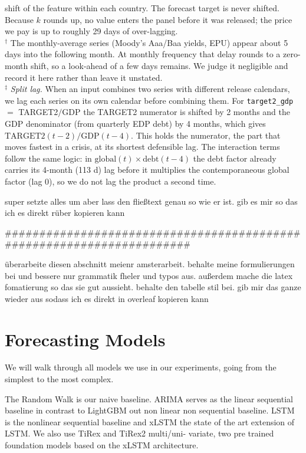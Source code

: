 \begin{table}[H]
shift of the feature within each country. The forecast target is never
shifted. Because $k$ rounds up, no value enters the panel before it was
released; the price we pay is up to roughly 29 days of over-lagging. \\[2pt]
$^{\dagger}$ The monthly-average series (Moody's Aaa/Baa yields, EPU) appear
about 5 days into the following month. At monthly frequency that delay rounds
to a zero-month shift, so a look-ahead of a few days remains. We judge it
negligible and record it here rather than leave it unstated. \\[2pt]
$^{\ddagger}$ \emph{Split lag.} When an input combines two series with
different release calendars, we lag each series on its own calendar before
combining them. For \texttt{target2\_gdp} $=$ TARGET2$/$GDP the TARGET2
numerator is shifted by 2 months and the GDP denominator (from quarterly EDP
debt) by 4 months, which gives $\text{TARGET2}(t{-}2)/\text{GDP}(t{-}4)$. This
holds the numerator, the part that moves fastest in a crisis, at its shortest
defensible lag. The interaction terms follow the same logic: in
$\text{global}(t)\times\text{debt}(t{-}4)$ the debt factor already carries its
4-month (113 d) lag before it multiplies the contemporaneous global factor
(lag 0), so we do not lag the product a second time.
\end{table}

super setzte alles um aber lass den fließtext genau so wie er ist. gib es mir so das ich es direkt rüber kopieren kann

######################################################################

überarbeite diesen abschnitt meienr amsterarbeit. behalte meine formulierungen bei und bessere nur grammatik fheler und typos aus. außerdem mache die latex fomatierung so das sie gut aussieht. behalte den tabelle stil bei. gib mir das ganze wieder aus sodass ich es direkt in overleaf kopieren kann



\section{Forecasting Models}

\label{sec:models}

We will walk through all models we use in our experiments, going from the simplest to the most complex. 

The Random Walk is our naive baseline. ARIMA serves as the linear sequential baseline in contrast to LightGBM out non linear non sequential baseline. LSTM is the nonlinear sequential baseline and xLSTM the state of the art extension of LSTM. We also use TiRex and TiRex2 multi/uni- variate, two pre trained foundation models based on the xLSTM architecture. 

